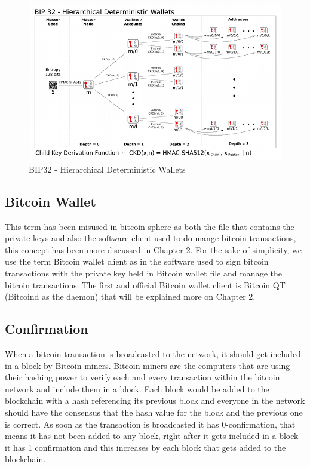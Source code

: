 \begin{figure}
\centering
\includegraphics[width=\linewidth]{fig/bip32derivation.png}
  \caption{BIP32 - Hierarchical Deterministic Wallets}
\label{fig:bip32}
\end{figure}


\subsection{Bitcoin Wallet}
This term has been misused in bitcoin sphere as both the file that contains the private keys and also the software client used to do mange bitcoin transactions, this concept has been more discussed in Chapter 2. For the sake of simplicity, we use the term Bitcoin wallet client as in the software used to sign bitcoin transactions with the private key held in Bitcoin wallet file and manage the bitcoin transactions.
The first and official Bitcoin wallet client is Bitcoin QT (Bitcoind as the daemon) that will be explained more on Chapter 2.


\subsection{Confirmation}
When a bitcoin transaction is broadcasted to the network, it should get included in a block by Bitcoin miners. Bitcoin miners are the computers that are using their hashing power to verify each and every transaction within the bitcoin network and include them in a block. Each block would be added to the blockchain with a hash referencing its previous block and everyone in the network should have the consensus that the hash value for the block and the previous one is correct. As soon as the transaction is broadcasted it has 0-confirmation, that means it has not been added to any block, right after it gets included in a block it has 1 confirmation and this increases by each block that gets added to the blockchain.

